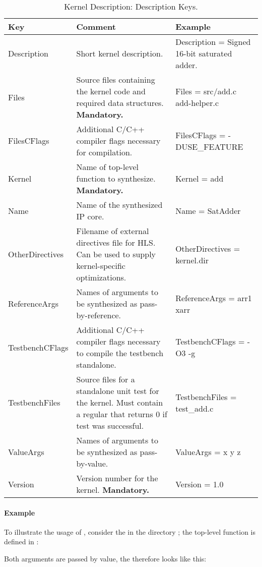 \begin{longtable}[c]{>{\sffamily}L{0.2\textwidth}L{0.35\textwidth}>{\ttfamily\footnotesize}L{.35\textwidth}}
  \caption{Kernel Description: Description Keys.}
  \label{tbl:kernel-description}\\
  \toprule
  \normalfont\normalsize\textbf{Key} & \textbf{Comment} & \normalfont\normalsize\textbf{Example} \\\midrule
  \endhead
  \bottomrule
  \endlastfoot
  Description & Short kernel description. & Description = Signed 16-bit saturated adder.\\\midrule
  Files & Source files containing the kernel code and required data structures. \textbf{Mandatory.} & Files = src/add.c add-helper.c \\\midrule
  FilesCFlags & Additional C/C++ compiler flags necessary for compilation. & FilesCFlags = -DUSE\_FEATURE \\\midrule
  Kernel & Name of top-level function to synthesize. \textbf{Mandatory.} & Kernel = add \\\midrule
  Name & Name of the synthesized IP core. & Name = SatAdder \\\midrule
  OtherDirectives & Filename of external directives file for HLS. Can be used to supply kernel-specific optimizations. & OtherDirectives = kernel.dir\\\midrule
  ReferenceArgs & Names of arguments to be synthesized as pass-by-reference. & ReferenceArgs = arr1 xarr\\\midrule
  TestbenchCFlags & Additional C/C++ compiler flags necessary to compile the testbench standalone. & TestbenchCFlags = -O3 -g\\\midrule
  TestbenchFiles & Source files for a standalone unit test for the kernel. Must contain a regular  that returns 0 if test was successful. & TestbenchFiles = test\_add.c \\\midrule
  ValueArgs & Names of arguments to be synthesized as pass-by-value. & ValueArgs = x y z\\\midrule
  Version & Version number for the kernel. \textbf{Mandatory.} & Version = 1.0 \\
\end{longtable}

\paragraph{Example}
To illustrate the usage of , consider the   in the directory ; the top-level function is defined in :
%

%
Both arguments are passed by value, the  therefore looks like this:
%

%


